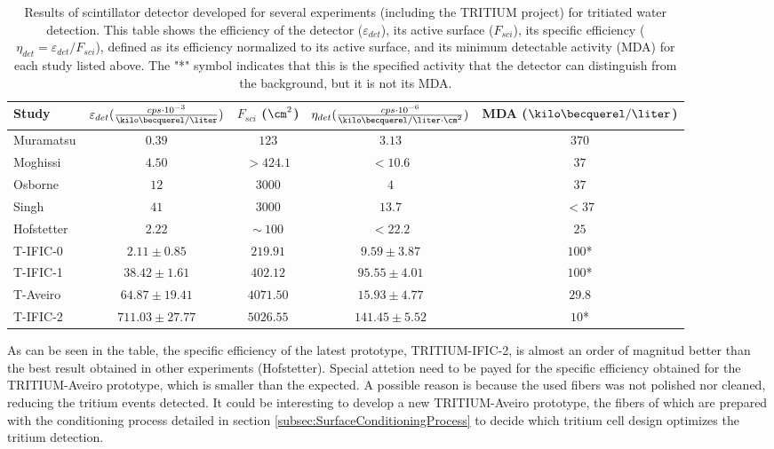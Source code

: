 \begin{table}[htbp]
\centering{}%
\begin{tabular}{lcccc}
\toprule 
Study & \parbox{5.5em}{$\varepsilon_{det}(\frac{cps \cdot{} 10^{-3}}{\kilo\becquerel/\liter})$}  & \parbox{4.5em}{$F_{sci}$ ($\cm^2$)}  & \parbox{6.5em}{$\eta_{det}(\frac{cps \cdot{} 10^{-6}}{\kilo\becquerel/ \liter \cdot{} \cm^2})$} & MDA ($\kilo\becquerel / \liter$) \tabularnewline
\midrule
\midrule 
Muramatsu & $0.39$ & $123$ & $3.13$ & $370$ \tabularnewline
Moghissi & $4.50$ & $>424.1$ & $<10.6$ & $37$ \tabularnewline
Osborne & $12$ & $3000$ & $4$ & $37$ \tabularnewline
Singh & $41$ & $3000$ & $13.7$ & $<37$ \tabularnewline
Hofstetter & $2.22$ & $\sim~100$ & $<22.2$ & $25$ \tabularnewline
T-IFIC-0 & $2.11 \pm 0.85$ & $219.91$ & $9.59 \pm 3.87$ & $100$* \tabularnewline
T-IFIC-1 & $38.42 \pm 1.61$ & $402.12$ & $95.55 \pm 4.01$ & $100$* \tabularnewline
T-Aveiro & $64.87 \pm 19.41$ & $4071.50$ & $15.93 \pm 4.77$ & $29.8$ \tabularnewline
T-IFIC-2 & $711.03 \pm 27.77$ & $5026.55$ & $141.45 \pm 5.52$ & $10$* \tabularnewline
\bottomrule
\end{tabular}
\caption{Results of scintillator detector developed for several experiments (including the TRITIUM project) for tritiated water detection. This table shows the efficiency of the detector ($\varepsilon_{det}$), its active surface ($F_{sci}$), its specific efficiency ($\eta_{det}=\varepsilon_{det}/F_{sci}$), defined as its efficiency normalized to its active surface, and its minimum detectable activity (MDA) for each study listed above. The "*" symbol indicates that this is the specified activity that the detector can distinguish from the background, but it is not its MDA.}
\label{tab:ComparisonResultsTri}
\end{table}

As can be seen in the table, the specific efficiency of the latest prototype, TRITIUM-IFIC-2, is almost an order of magnitud better than the best result obtained in other experiments (Hofstetter). Special attetion need to be payed for the specific efficiency obtained for the TRITIUM-Aveiro prototype, which is smaller than the expected. A possible reason is because the used fibers was not polished nor cleaned, reducing the tritium events detected. It could be interesting to develop a new TRITIUM-Aveiro prototype, the fibers of which are prepared with the conditioning process detailed in section \ref{subsec:SurfaceConditioningProcess} to decide which tritium cell design optimizes the tritium detection. 

